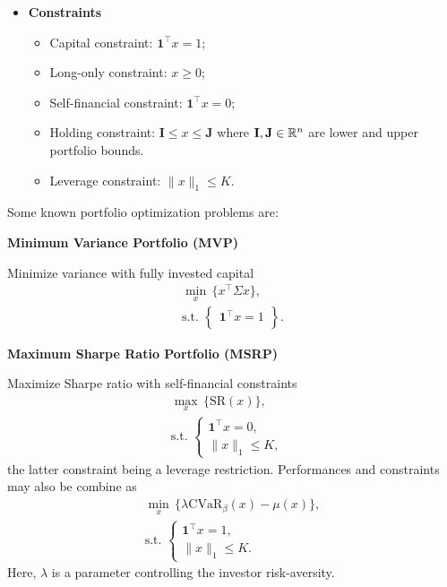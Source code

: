 \begin{itemize}
	\item \textbf{Constraints}
	      \begin{itemize}
		      \item Capital constraint: $\textbf{1}^\top x=1$;
		      \item Long-only constraint: $x\geq0$;
		      \item Self-financial constraint: $\textbf{1}^\top x=0$;
		      \item Holding constraint: $\mathbf{I}\leq x\leq \mathbf{J}$ where $\mathbf{I},\mathbf{J}\in\mathbb{R}^n$ are lower and upper portfolio bounds.
		      \item Leverage constraint: $\|x\|_1\leq K$.
	      \end{itemize}
\end{itemize}

Some known portfolio optimization problems are:

\noindent\textbf{Minimum Variance Portfolio (MVP)}

Minimize variance with fully invested capital
\begin{eqnarray}\label{eq:MVP}
	\min_{x} \,\big\{x^\top \Sigma x\big\}, \\
	\mbox{s.t. }\left\{
	\begin{aligned}
		\mathbf{1}^\top x=1 \\
	\end{aligned}
	\right\}.\nonumber
\end{eqnarray}

\noindent\textbf{Maximum Sharpe Ratio Portfolio (MSRP)}

Maximize Sharpe ratio with self-financial constraints
\begin{eqnarray*}
	\max_{x} \,\big\{\mbox{SR}(x)\big\}, \\
	\mbox{s.t. }\left\{
	\begin{aligned}\nonumber
		\mathbf{1}^\top x=0, & \\
		\|x\|_1\leq K,
	\end{aligned}
	\right.
\end{eqnarray*}
the latter constraint being a leverage restriction. Performances and constraints may also be combine as
\begin{eqnarray*}
	\min_{x} \,\big\{\lambda \mbox{CVaR}_\beta(x) - \mu(x)\big\}, \\
	\mbox{s.t. }\left\{
	\begin{aligned}\nonumber
		\mathbf{1}^\top x=1, & \\
		\|x\|_1\leq K.
	\end{aligned}
	\right.
\end{eqnarray*}
Here, $\lambda$ is a parameter controlling the investor risk-aversity.

